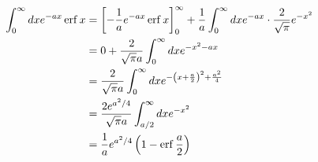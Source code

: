 \item

\begin{align*}
    \int_0^\infty dx e^{-ax} \operatorname{erf} x
    &= {\left[ -\frac{1}{a} e^{-ax} \operatorname{erf} x \right]_{0}^{\infty}}
     + \frac{1}{a} \int_0^\infty dx e^{-ax} \cdot \frac{2}{\sqrt{\pi}} e^{-x^2} \\
    &= 0 + \frac{2}{\sqrt{\pi} a} \int_0^\infty dx e^{-x^2 - ax} \\
    &= \frac{2}{\sqrt{\pi} a} \int_0^\infty dx e^{-{\left( x + \frac{a}{2} \right)}^2 + \frac{a^2}{4}} \\
    &= \frac{2 e^{a^2/4}}{\sqrt{\pi} a} \int_{a/2}^\infty dx e^{-x^2} \\
    &= \frac{1}{a} e^{a^2/4} \left( 1 - \operatorname{erf} \frac{a}{2} \right)
\end{align*}